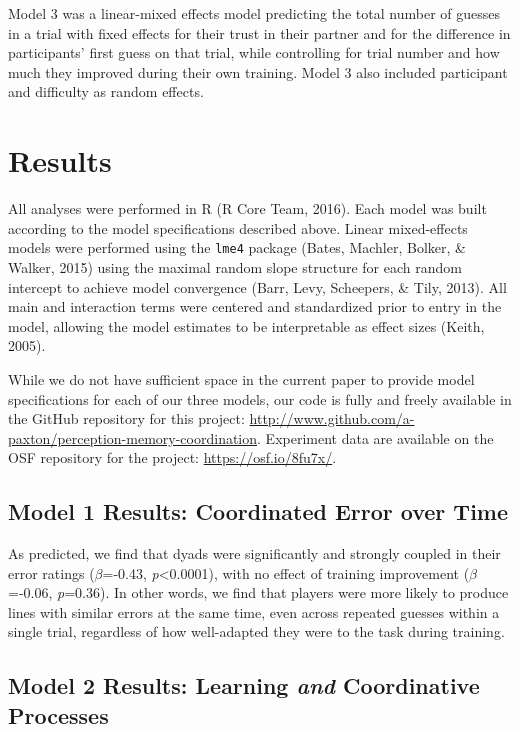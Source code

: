\documentclass[10pt, letterpaper]{article}
\begin{document}
Model 3 was a linear-mixed effects model predicting the total number of
guesses in a trial with fixed effects for their trust in their partner
and for the difference in participants' first guess on that trial, while
controlling for trial number and how much they improved during their own
training. Model 3 also included participant and difficulty as random
effects.

\section{Results}\label{results}

All analyses were performed in R (R Core Team, 2016). Each model was
built according to the model specifications described above. Linear
mixed-effects models were performed using the \texttt{lme4} package
(Bates, Machler, Bolker, \& Walker, 2015) using the maximal random slope
structure for each random intercept to achieve model convergence (Barr,
Levy, Scheepers, \& Tily, 2013). All main and interaction terms were
centered and standardized prior to entry in the model, allowing the
model estimates to be interpretable as effect sizes (Keith, 2005).

While we do not have sufficient space in the current paper to provide
model specifications for each of our three models, our code is fully and
freely available in the GitHub repository for this project:
\url{http://www.github.com/a-paxton/perception-memory-coordination}.
Experiment data are available on the OSF repository for the project:
\url{https://osf.io/8fu7x/}.

\subsection{Model 1 Results: Coordinated Error over
Time}\label{model-1-results-coordinated-error-over-time}

As predicted, we find that dyads were significantly and strongly coupled
in their error ratings (\emph{\(\beta\)}=-0.43,
\emph{p}\textless{}0.0001), with no effect of training improvement
(\emph{\(\beta\)}=-0.06, \emph{p}=0.36). In other words, we find that
players were more likely to produce lines with similar errors at the
same time, even across repeated guesses within a single trial,
regardless of how well-adapted they were to the task during training.

\subsection{\texorpdfstring{Model 2 Results: Learning \emph{and}
Coordinative
Processes}{Model 2 Results: Learning and Coordinative Processes}}\label{model-2-results-learning-and-coordinative-processes}
\end{document}
